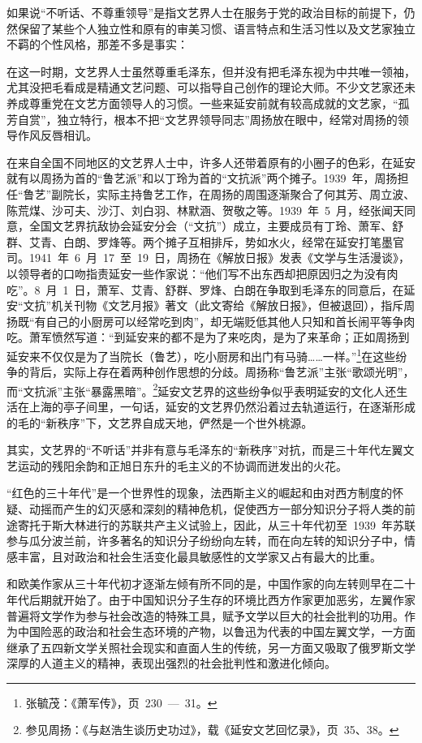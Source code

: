 如果说“不听话、不尊重领导”是指文艺界人士在服务于党的政治目标的前提下，仍然保留了某些个人独立性和原有的审美习惯、语言特点和生活习性以及文艺家独立不羁的个性风格，那差不多是事实：

在这一时期，文艺界人士虽然尊重毛泽东，但并没有把毛泽东视为中共唯一领袖，尤其没把毛看成是精通文艺问题、可以指导自己创作的理论大师。不少文艺家还未养成尊重党在文艺方面领导人的习惯。一些来延安前就有较高成就的文艺家，“孤芳自赏”，独立特行，根本不把“文艺界领导同志”周扬放在眼中，经常对周扬的领导作风反唇相讥。

在来自全国不同地区的文艺界人士中，许多人还带着原有的小圈子的色彩，在延安就有以周扬为首的“鲁艺派”和以丁玲为首的“文抗派”两个摊子。1939~年，周扬担任“鲁艺”副院长，实际主持鲁艺工作，在周扬的周围逐渐聚合了何其芳、周立波、陈荒煤、沙可夫、沙汀、刘白羽、林默涵、贺敬之等。1939~年~5~月，经张闻天同意，全国文艺界抗敌协会延安分会（“文抗”）成立，主要成员有丁玲、萧军、舒群、艾青、白朗、罗烽等。两个摊子互相排斥，势如水火，经常在延安打笔墨官司。1941~年~6~月~17~至~19~日，周扬在《解放日报》发表《文学与生活漫谈》，以领导者的口吻指责延安一些作家说：“他们写不出东西却把原因归之为没有肉吃”。8~月~1~日，萧军、艾青、舒群、罗烽、白朗在争取到毛泽东的同意后，在延安“文抗”机关刊物《文艺月报》著文（此文寄给《解放日报》，但被退回），指斥周扬既“有自己的小厨房可以经常吃到肉”，却无端贬低其他人只知和首长闹平等争肉吃。萧军愤然写道：“到延安来的都不是为了来吃肉，是为了来革命；正如周扬到延安来不仅仅是为了当院长（鲁艺），吃小厨房和出门有马骑……一样。”\footnote{张毓茂：《萧军传》，页~230~—~31。}在这些纷争的背后，实际上存在着两种创作思想的分歧。周扬称“鲁艺派”主张“歌颂光明”，而“文抗派”主张“暴露黑暗”。\footnote{参见周扬：《与赵浩生谈历史功过》，载《延安文艺回忆录》，页~35、38。}延安文艺界的这些纷争似乎表明延安的文化人还生活在上海的亭子间里，一句话，延安的文艺界仍然沿着过去轨道运行，在逐渐形成的毛的“新秩序”下，文艺界自成天地，俨然是一个世外桃源。

其实，文艺界的“不听话”并非有意与毛泽东的“新秩序”对抗，而是三十年代左翼文艺运动的残阳余韵和正旭日东升的毛主义的不协调而迸发出的火花。

“红色的三十年代”是一个世界性的现象，法西斯主义的崛起和由对西方制度的怀疑、动摇而产生的幻灭感和深刻的精神危机，促使西方一部分知识分子将人类的前途寄托于斯大林进行的苏联共产主义试验上，因此，从三十年代初至~1939~年苏联参与瓜分波兰前，许多著名的知识分子纷纷向左转，而在向左转的知识分子中，情感丰富，且对政治和社会生活变化最具敏感性的文学家又占有最大的比重。

和欧美作家从三十年代初才逐渐左倾有所不同的是，中国作家的向左转则早在二十年代后期就开始了。由于中国知识分子生存的环境比西方作家更加恶劣，左翼作家普遍将文学作为参与社会改造的特殊工具，赋予文学以巨大的社会批判的功用。作为中国险恶的政治和社会生态环境的产物，以鲁迅为代表的中国左翼文学，一方面继承了五四新文学关照社会现实和直面人生的传统，另一方面又吸取了俄罗斯文学深厚的人道主义的精神，表现出强烈的社会批判性和激进化倾向。

